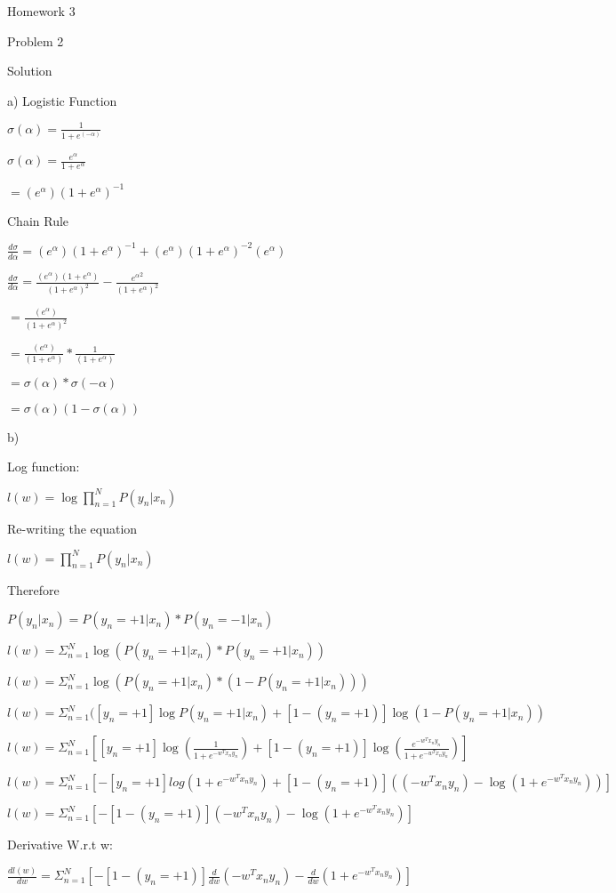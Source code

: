 \documentclass[12pt]{article}
\begin{document}
Homework 3

Problem 2

Solution

a) Logistic Function

$ \sigma(\alpha) = \frac{1}{1+e^{(-\alpha)}}$

$ \sigma(\alpha) = \frac{e^\alpha}{1+e^\alpha}$

$= (e^\alpha){(1+e^\alpha)}^{-1}$

Chain Rule

$\frac{d\sigma}{d\alpha} = (e^\alpha){(1+e^\alpha)}^{-1} + (e^\alpha){(1+e^\alpha)}^{-2}(e^\alpha)$

$\frac{d\sigma}{d\alpha}= \frac{(e^\alpha)(1+e^\alpha)}{{(1+e^\alpha)^2}}- \frac{{e^\alpha}^2}{{(1+e^\alpha)^2}}$


$= \frac{(e^\alpha)}{{(1+e^\alpha)^2}}$

$ = \frac{(e^\alpha)}{(1+e^\alpha)} * \frac{1}{(1+e^\alpha)}$

$= \sigma(\alpha)*\sigma(-\alpha)$

$= \sigma(\alpha)(1-\sigma(\alpha))$

b)

Log function: 

$l(w) = \log \prod_{n=1}^N P(y_n|x_n)$

Re-writing the equation 

$l(w) = \prod_{n=1}^N P(y_n|x_n)$

Therefore

$P(y_n|x_n) = P(y_n = +1|x_n)*P(y_n = -1|x_n)$

$l(w) = \Sigma_{n=1}^N\log(P(y_n = +1|x_n) * P(y_n = +1|x_n))$

$l(w) = \Sigma_{n=1}^N\log(P(y_n = +1|x_n) * (1 - P(y_n = +1|x_n)))$

$l(w) = \Sigma_{n=1}^N([y_n = +1] \log P(y_n = +1|x_n)+[1 -(y_n = +1)]\log(1 - P(y_n = +1|x_n))$

$l(w) = \Sigma_{n=1}^N[[y_n = +1]\log(\frac{1}{1+e^{-w^{T}x_{n}y_{n}}})+[1 - (y_n = +1)]\log(\frac{e^{-w^{T}x_{n}y_{n}}}{{1+e^{-w^{T}x_{n}y_{n}}}})]$

$l(w) = \Sigma_{n=1}^N[-[y_n = +1]log(1+e^{-w^{T}x_{n}y_{n}})+ [1-(y_n = +1)]((-w^{T}x_{n}y_{n})-\log(1+e^{-w^{T}x_{n}y_{n}}))]$

$l(w) = \Sigma_{n=1}^N[-[1-(y_n = +1)](-w^{T}x_{n}y_{n})-\log(1+e^{-w^{T}x_{n}y_{n}})]$

Derivative W.r.t w:


$\frac{dl(w)}{dw} = \Sigma_{n=1}^N[-[1-(y_n = +1)]\frac{d}{dw}(-w^{T}x_{n}y_{n})-\frac{d}{dw}(1+e^{-w^{T}x_{n}y_{n}})]$
\end{document}
